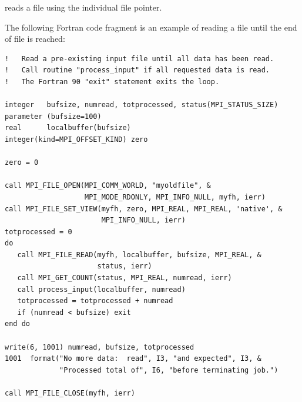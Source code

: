  reads a file using the individual file pointer.

\begin{example}
\label{io-readtoend}
The following Fortran code fragment is an example of reading
a file until the end of file is reached:
\begin{lstlisting}[language={[MPI]Fortran}]
!   Read a pre-existing input file until all data has been read.
!   Call routine "process_input" if all requested data is read.
!   The Fortran 90 "exit" statement exits the loop.

integer   bufsize, numread, totprocessed, status(MPI_STATUS_SIZE)
parameter (bufsize=100)
real      localbuffer(bufsize)
integer(kind=MPI_OFFSET_KIND) zero

zero = 0

call MPI_FILE_OPEN(MPI_COMM_WORLD, "myoldfile", &
                   MPI_MODE_RDONLY, MPI_INFO_NULL, myfh, ierr)
call MPI_FILE_SET_VIEW(myfh, zero, MPI_REAL, MPI_REAL, 'native', &
                       MPI_INFO_NULL, ierr)
totprocessed = 0
do
   call MPI_FILE_READ(myfh, localbuffer, bufsize, MPI_REAL, &
                      status, ierr)
   call MPI_GET_COUNT(status, MPI_REAL, numread, ierr)
   call process_input(localbuffer, numread)
   totprocessed = totprocessed + numread
   if (numread < bufsize) exit
end do

write(6, 1001) numread, bufsize, totprocessed
1001  format("No more data:  read", I3, "and expected", I3, &
             "Processed total of", I6, "before terminating job.")

call MPI_FILE_CLOSE(myfh, ierr)
\end{lstlisting}
\end{example}

